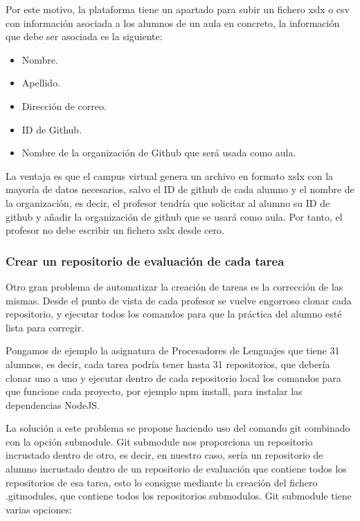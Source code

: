 Por este motivo, la plataforma tiene un apartado para subir un fichero xslx o csv con información asociada a los alumnos de un aula en concreto, la información que debe ser asociada es la siguiente:

\begin{itemize}
  \item Nombre.
  \item Apellido.
  \item Dirección de correo.
  \item ID de Github.
  \item Nombre de la organización de Github que será usada como aula.
\end{itemize}

La ventaja es que el campus virtual genera un archivo en formato xslx con la mayoría de datos necesarios, salvo el ID de github de cada alumno y el nombre de la organización, es decir, el profesor tendría que solicitar al alumno su ID de github y añadir la organización de github que se usará como aula.
Por tanto, el profesor no debe escribir un fichero xslx desde cero.

\subsubsection{Crear un repositorio de evaluación de cada tarea}

Otro gran problema de automatizar la creación de tareas es la corrección de las mismas. Desde el punto de vista de cada profesor se vuelve engorroso clonar cada repositorio, y ejecutar todos los comandos para que la práctica del alumno esté lista para corregir.

Pongamos de ejemplo la asignatura de Procesadores de Lenguajes que tiene 31 alumnos, es decir, cada tarea podría tener hasta 31 repositorios, que debería clonar uno a uno y ejecutar dentro de cada repositorio local los comandos para que funcione cada proyecto, por ejemplo npm install, para instalar las dependencias NodeJS.

La solución a este problema se propone haciendo uso del comando git combinado con la opción submodule. Git submodule nos proporciona un repositorio incrustado dentro de otro, es decir, en nuestro caso, sería un repositorio de alumno incrustado dentro de un repositorio de evaluación que contiene todos los repositorios de esa tarea, esto lo consigue mediante la creación del fichero .gitmodules, que contiene todos los repositorios submodulos. Git submodule tiene varias opciones: 

